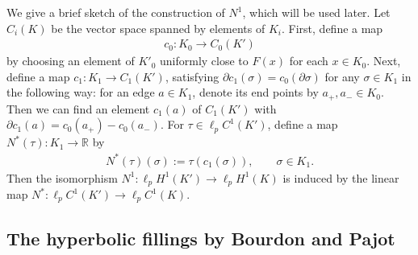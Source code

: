 \documentclass[10pt]{amsart}
\theoremstyle{definition}\newtheorem{defi}[theo]{Definition}\newtheorem{rema}[theo]{Remark}\newtheorem{exam}[theo]{Example}\newtheorem{exem}[theo]{Example}\newtheorem{nota}[theo]{Notation}
\newcommand{\br}{\mathbb{R}}
\begin{document}
We give a brief sketch of the construction of $N^1$, which will be used later. Let $C_i(K)$ be the vector space spanned by elements of $K_i$. First, define a map
\begin{align}\label{c0}
c_0:K_0\rightarrow C_0(K')
\end{align}
by choosing an element of $K'_0$ uniformly close to $F(x)$ for each $x\in K_0$. Next, define a map $c_1:K_1\rightarrow C_1(K')$, satisfying $\partial c_1(\sigma)=c_0(\partial\sigma)$ for any $\sigma\in K_1$ in the following way: for an edge $a\in K_1$, denote its end points by $a_{+},a_{-}\in K_0$. Then we can find an element $c_1(a)$ of $C_1(K')$ with $\partial c_1(a)=c_0(a_{+})-c_0(a_{-})$. For $\tau\in\ell_pC^1(K')$, define a map $N^*(\tau):K_1\rightarrow\br$ by
\begin{align}\label{n*}
N^*(\tau)(\sigma):=\tau(c_1(\sigma)),\qquad \sigma\in K_1.
\end{align}
Then the isomorphism $N^1:\ell_pH^1(K')\rightarrow\ell_pH^1(K)$ is induced by the linear map \newline
$N^*:\ell_pC^1(K')\rightarrow\ell_pC^1(K)$.

\subsection{The hyperbolic fillings by Bourdon and Pajot}
\end{document}
